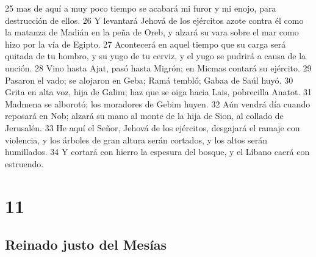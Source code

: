 25 mas de aquí a muy poco tiempo se acabará mi furor y mi enojo, para destrucción de ellos.
26 Y levantará Jehová de los ejércitos azote contra él como la matanza de Madián en la peña de Oreb, y alzará su vara sobre el mar como hizo por la vía de Egipto.
27 Acontecerá en aquel tiempo que su carga será quitada de tu hombro, y su yugo de tu cerviz, y el yugo se pudrirá a causa de la unción.
28 Vino hasta Ajat, pasó hasta Migrón; en Micmas contará su ejército.
29 Pasaron el vado; se alojaron en Geba; Ramá tembló; Gabaa de Saúl huyó.
30 Grita en alta voz, hija de Galim; haz que se oiga hacia Lais, pobrecilla Anatot.
31 Madmena se alborotó; los moradores de Gebim huyen.
32 Aún vendrá día cuando reposará en Nob; alzará su mano al monte de la hija de Sion, al collado de Jerusalén.
33 He aquí el Señor, Jehová de los ejércitos, desgajará el ramaje con violencia, y los árboles de gran altura serán cortados, y los altos serán humillados.
34 Y cortará con hierro la espesura del bosque, y el Líbano caerá con estruendo.

\chapter{11}

\section*{Reinado justo del Mesías}

